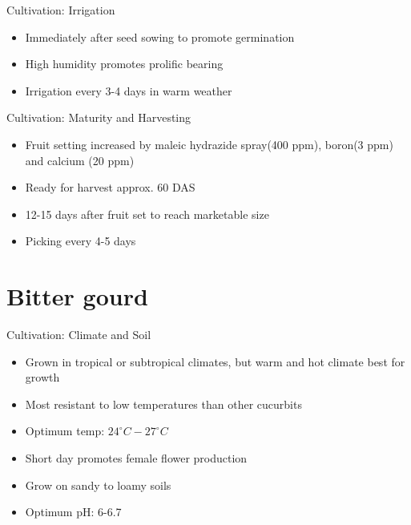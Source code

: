 \documentclass[
  ignorenonframetext,
  aspectratio=169]{beamer}
\providecommand{\tightlist}{%
  \setlength{\itemsep}{0pt}\setlength{\parskip}{0pt}}
\begin{document}
\begin{frame}{Cultivation: Irrigation}
\protect\hypertarget{cultivation-irrigation}{}
\begin{itemize}
\tightlist
\item
  Immediately after seed sowing to promote germination
\item
  High humidity promotes prolific bearing
\item
  Irrigation every 3-4 days in warm weather
\end{itemize}
\end{frame}

\begin{frame}{Cultivation: Maturity and Harvesting}
\protect\hypertarget{cultivation-maturity-and-harvesting}{}
\begin{itemize}
\tightlist
\item
  Fruit setting increased by maleic hydrazide spray(400 ppm), boron(3
  ppm) and calcium (20 ppm)
\item
  Ready for harvest approx. 60 DAS
\item
  12-15 days after fruit set to reach marketable size
\item
  Picking every 4-5 days
\end{itemize}
\end{frame}

\hypertarget{bitter-gourd}{%
\section{Bitter gourd}\label{bitter-gourd}}

\begin{frame}{Cultivation: Climate and Soil}
\protect\hypertarget{cultivation-climate-and-soil}{}
\begin{itemize}
\tightlist
\item
  Grown in tropical or subtropical climates, but warm and hot climate
  best for growth
\item
  Most resistant to low temperatures than other cucurbits
\item
  Optimum temp: \(24^\circ C-27^\circ C\)
\item
  Short day promotes female flower production
\item
  Grow on sandy to loamy soils
\item
  Optimum pH: 6-6.7
\end{itemize}
\end{frame}
\end{document}
